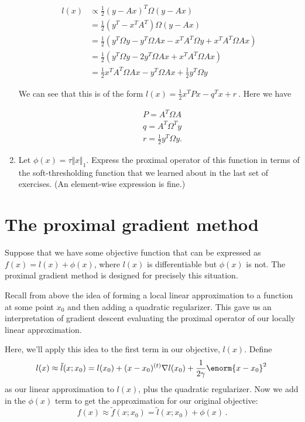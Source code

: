 \documentclass{article}
\begin{document}
\begin{enumerate}[label=(\Alph*)]
{\begin{align}
		l(x) &\propto \frac{1}{2}(y - Ax)^T \Omega (y - Ax) \\
		&= \frac{1}{2}(y^T - x^TA^T)\Omega (y - Ax) \\
		&= \frac{1}{2}(y^T\Omega y - y^T\Omega Ax - x^TA^T\Omega y + x^TA^T\Omega Ax) \\
		&= \frac{1}{2}(y^T\Omega y - 2 y^T\Omega Ax + x^TA^T\Omega Ax) \\
		&= \frac{1}{2}x^TA^T\Omega Ax - y^T\Omega Ax + \frac{1}{2}y^T\Omega y 
\end{align}

We can see that this is of the form $l(x) = \frac{1}{2} x^{T} P x - q^{T} x + r \ $. Here we have 

\begin{align}
&P = A^T\Omega A\\
&q = A^T \Omega^T y\\ 
&r = \frac{1}{2}y^T \Omega y.
\end{align}





}
\item  Let $\phi(x) = \tau \Vert x \Vert_1$.  Express the proximal operator of this function in terms of the soft-thresholding function that we learned about in the last set of exercises.  (An element-wise expression is fine.)

\end{enumerate}


\section{The proximal gradient method}

Suppose that we have some objective function that can be expressed as $f(x) = l(x) + \phi(x)$, where $l(x)$ is differentiable but $\phi(x)$ is not.  The proximal gradient method is designed for precisely this situation.

Recall from above the idea of forming a local linear approximation to a function at some point $x_0$ and then adding a quadratic regularizer.  This gave us an interpretation of gradient descent evaluating the proximal operator of our locally linear approximation.

Here, we'll apply this idea to the first term in our objective, $l(x)$. Define
$$
l(x) \approx \tilde{l}(x; x_0) = l(x_0) + (x - x_0)^{(t)} \nabla l(x_0) + \frac{1}{2\gamma} \enorm{x - x_0}^2 \, 
$$
as our linear approximation to $l(x)$, plus the quadratic regularizer.  Now we add in the $\phi(x)$ term to get the approximation for our original objective:
\begin{equation}
\label{eqn:pg_approx}
f(x) \approx \tilde{f}(x; x_0) = \tilde{l}(x; x_0) + \phi(x)   \, .
\end{equation}
\end{document}
